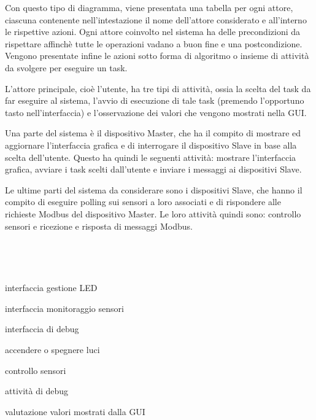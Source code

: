 \documentclass[a4paper,titlepage]{book}
\begin{document}
Con questo tipo di diagramma, viene presentata una tabella per ogni attore, ciascuna contenente nell'intestazione il nome dell'attore considerato e all'interno le rispettive azioni. Ogni attore coinvolto nel sistema ha delle precondizioni da rispettare affinchè tutte le operazioni vadano a buon fine e una postcondizione. Vengono presentate infine le azioni sotto forma di algoritmo o insieme di attività da svolgere per eseguire un task.

L'attore principale, cioè l'utente, ha tre tipi di attività, ossia la scelta del task da far eseguire al sistema, l'avvio di esecuzione di tale task (premendo l'opportuno tasto nell'interfaccia) e l'osservazione dei valori che vengono mostrati nella GUI.

Una parte del sistema è il dispositivo Master, che ha il compito di mostrare ed aggiornare l'interfaccia grafica e di interrogare il dispositivo Slave in base alla scelta dell'utente. Questo ha quindi le seguenti attività: mostrare l'interfaccia grafica, avviare i task scelti dall'utente e inviare i messaggi ai dispositivi Slave.

Le ultime parti del sistema da considerare sono i dispositivi Slave, che hanno il compito di eseguire polling sui sensori a loro associati e di rispondere alle richieste Modbus del dispositivo Master. Le loro attività quindi sono: controllo sensori e ricezione e risposta di messaggi Modbus.

~

~

\begin{usecase}
  	{\item interfaccia gestione LED
                             	\item interfaccia monitoraggio sensori
				\item interfaccia di debug}

  	{\item accendere o spegnere luci
                             	\item controllo sensori
				\item attività di debug}

  	{\item valutazione valori mostrati dalla GUI}

\end{usecase}
\end{document}
